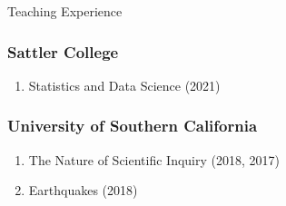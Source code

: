 \begin{rSection}{Teaching Experience}
	\subsubsection*{Sattler College}
		\begin{enumerate}
			\item Statistics and Data Science (2021)
		\end{enumerate}
	\subsubsection*{University of Southern California}
		\begin{enumerate}
			\item The Nature of Scientific Inquiry (2018, 2017)
			\item Earthquakes (2018)
		\end{enumerate}
\end{rSection}
